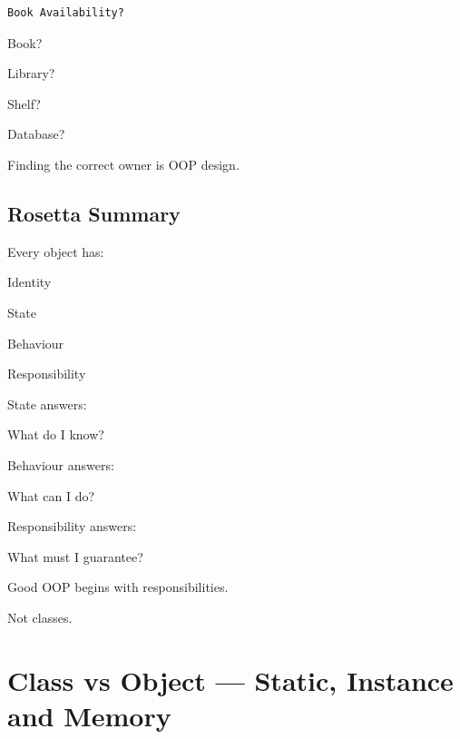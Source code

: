 \documentclass[11pt,a4paper]{book}
\begin{document}
\begin{verbatim}
Book Availability?
\end{verbatim}

Book?

Library?

Shelf?

Database?

Finding the correct owner is OOP design.


\section{Rosetta Summary}

\begin{rosettarule}

Every object has:

Identity

State

Behaviour

Responsibility

\end{rosettarule}

\begin{rosettarule}

State answers:

What do I know?

\end{rosettarule}

\begin{rosettarule}

Behaviour answers:

What can I do?

\end{rosettarule}

\begin{rosettarule}

Responsibility answers:

What must I guarantee?

\end{rosettarule}

\begin{rosettarule}

Good OOP begins with responsibilities.

Not classes.

\end{rosettarule}
\chapter{Class vs Object --- Static, Instance and Memory}\label{chap:class_vs_object}
\end{document}
